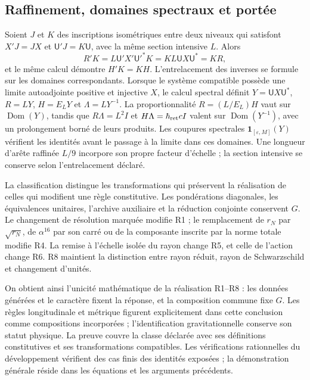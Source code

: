 \subsection{Raffinement, domaines spectraux et portée}

Soient \(J\) et \(K\) des inscriptions isométriques entre deux niveaux qui
satisfont \(X'J=JX\) et \(\mathsf U'J=K\mathsf U\),
avec la même section intensive \(L\). Alors
\[
 R'K=L\mathsf U'X'\mathsf U'^*K
     =KL\mathsf U X\mathsf U^*=KR,
\]
et le même calcul démontre \(H'K=KH\). L'entrelacement des
inverses se formule sur les domaines correspondants. Lorsque le système
compatible possède une limite autoadjointe positive et injective \(X\),
le calcul spectral définit \(Y=\mathsf U X\mathsf U^*\),
\(R=LY\), \(H=E_{L}Y\) et \(\Lambda=LY^{-1}\). La proportionnalité
\(R=(L/E_{L})H\) vaut sur \(\operatorname{Dom}(Y)\), tandis que
\(R\Lambda=L^2I\) et \(H\Lambda=\hbar_{\rm ret}cI\) valent sur
\(\operatorname{Dom}(Y^{-1})\), avec un prolongement borné de leurs
produits. Les coupures spectrales
\(\mathbf1_{[\varepsilon,M]}(Y)\) vérifient les identités avant
le passage à la limite dans ces domaines. Une longueur d'arête raffinée
\(L/9\) incorpore son propre facteur d'échelle ; la section intensive
se conserve selon l'entrelacement déclaré.

La classification distingue les transformations qui préservent la réalisation de celles qui modifient une règle constitutive. Les pondérations diagonales, les équivalences unitaires, l'archive auxiliaire et la réduction conjointe conservent \(G\). Le changement de résolution marquée modifie R1 ; le remplacement de \(r_N\) par \(\sqrt{r_N}\), de \(\alpha^{16}\) par son carré ou de la composante inscrite par la norme totale modifie R4. La remise à l'échelle isolée du rayon change R5, et celle de l'action change R6. R8 maintient la distinction entre rayon réduit, rayon de Schwarzschild et changement d'unités.

On obtient ainsi l'unicité mathématique de la réalisation R1--R8 : les données
générées et le caractère fixent la réponse, et la composition commune fixe
\(G\). Les règles longitudinale et métrique figurent explicitement dans
cette conclusion comme compositions incorporées ; l'identification
gravitationnelle conserve son statut physique. La preuve couvre la classe
déclarée avec ses définitions constitutives et ses transformations
compatibles. Les vérifications rationnelles du développement vérifient
des cas finis des identités exposées ; la démonstration générale
réside dans les équations et les arguments précédents.
